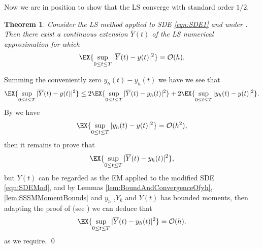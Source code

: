 \documentclass[sort&compress, preprint]{elsarticle}
\theoremstyle{definition}
\theoremstyle{plain}%
\newtheorem{thm}{Theorem}[section]
\theoremstyle{remark}
\newcommand{\SM}{LS\xspace}
\begin{document}
	Now we are in position to show that the \SM converge with standard order $1/2$.

\begin{thm}
	Consider the \SM method applied to SDE \eqref{eqn:SDE1} and under .
	Then there exist a continuous extension $\overline{Y}(t)$ of the LS numerical approximation for which
	\begin{equation*}
		\EX{
			\sup_{0 \leq t \leq T}
			|\overline{Y}(t) - y(t)|^2	
		} = \mathcal{O}(h).	
	\end{equation*}
\end{thm}
\begin{pf}
	Summing the conveniently zero $ y_h(t) - y_h(t)$ we have we see that
	\begin{align*}
		\EX{
			\sup_{0 \leq t \leq T}	
			|\overline{Y}(t) - y(t)|^2
		}
		&\leq 
		2 \EX{
			\sup_{0 \leq t \leq T}	
			|\overline{Y}(t) - y_h(t)|^2
		}
		+
		2 \EX{
			\sup_{0 \leq t \leq T}	
			|y_h(t) - y(t) |^2
		}.\\		
	\end{align*}	
	By  we have
	$$
		\EX{
			\sup_{0 \leq t \leq T}	
			|y_h(t) - y(t) |^2 
		}= \mathcal{O}(h^2),
	$$
	then it remains to prove that 
	$$
		\EX{
			\sup_{0 \leq t \leq T}	
			|\overline{Y}(t) - y_h(t)|^2
		},
	$$
	but  $\overline{Y}(t)$ can be regarded as the EM applied to the modified SDE \eqref{eqn:SDEMod}, and by
	Lemmas \eqref{lem:BoundAndConvergenceOfyh},\eqref{lem:SSSMMomentBounds} and 
	$y_h$ ,$Y_k$ and $\overline{Y}(t)$ has bounded moments, then adapting the proof of 
	 (see \cite[Thm. 4.4]{Higham2002b}) we can deduce that
	\begin{equation*}
		\EX{
			\sup_{0 \leq t \leq T}	
			|\overline{Y}(t) - y_h(t)|^2
		} = \mathcal{O}(h).
	\end{equation*}
	as we require. \qed
\end{pf}
%

	\pagebreak
\end{document}
